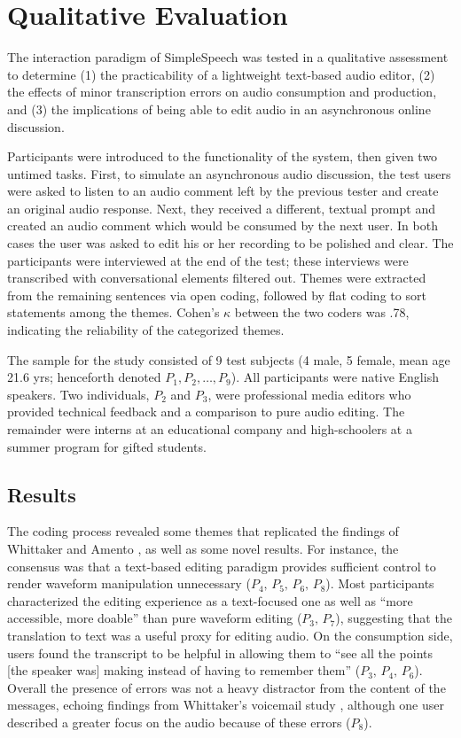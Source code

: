 \section{Qualitative Evaluation}

The interaction paradigm of SimpleSpeech was tested in a qualitative assessment to determine (1) the practicability of a lightweight text-based audio editor, (2) the effects of minor transcription errors on audio consumption and production, and (3) the implications of being able to edit audio in an asynchronous online discussion.

Participants were introduced to the functionality of the system, then given two untimed tasks. 
First, to simulate an asynchronous audio discussion, the test users were asked to listen to an audio comment left by the previous tester and create an original audio response. 
Next, they received a different, textual prompt and created an audio comment which would be consumed by the next user. 
In both cases the user was asked to edit his or her recording to be polished and clear.
The participants were interviewed at the end of the test; these interviews were transcribed with conversational elements filtered out.
Themes were extracted from the remaining sentences via open coding, followed by flat coding to sort statements among the themes. 
Cohen's $\kappa$ between the two coders was .78, indicating the reliability of the categorized themes.

The sample for the study consisted of 9 test subjects (4 male, 5 female, mean age 21.6 yrs; henceforth denoted $P_1, P_2, \ldots, P_9$). 
All participants were native English speakers. 
Two individuals, $P_2$ and $P_3$, were professional media editors who provided technical feedback and a comparison to pure audio editing.
The remainder were interns at an educational company and high-schoolers at a summer program for gifted students.

\subsection{Results}
The coding process revealed some themes that replicated the findings of Whittaker and Amento \cite{whittaker_semantic}, as well as some novel results.
For instance, the consensus was that a text-based editing paradigm provides sufficient control to render waveform manipulation unnecessary ($P_4,\,P_5,\,P_6,\,P_8$).
Most participants characterized the editing experience as a text-focused one as well as ``more accessible, more doable'' than pure waveform editing ($P_3,\,P_7$), suggesting that the translation to text was a useful proxy for editing audio.
On the consumption side, users found the transcript to be helpful in allowing them to ``see all the points [the speaker was] making instead of having to remember them'' ($P_3,\,P_4,\,P_6$).
Overall the presence of errors was not a heavy distractor from the content of the messages, echoing findings from Whittaker's voicemail study \cite{whittaker}, although one user described a greater focus on the audio because of these errors ($P_8$).

